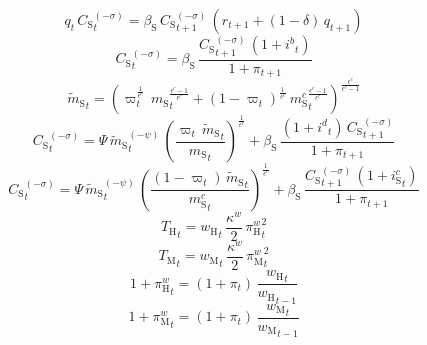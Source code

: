\begin{dmath}
{q}_{t}\, {C_\mathrm{S}}_{t}^{\left(-{\sigma}\right)}={\beta_\mathrm{S}}\, {C_\mathrm{S}}_{t+1}^{\left(-{\sigma}\right)}\, \left({r}_{t+1}+\left(1-{\delta}\right)\, {q}_{t+1}\right)
\end{dmath}
\begin{dmath}
{C_\mathrm{S}}_{t}^{\left(-{\sigma}\right)}={\beta_\mathrm{S}}\, \frac{{C_\mathrm{S}}_{t+1}^{\left(-{\sigma}\right)}\, \left(1+{i^b}_{t}\right)}{1+{\pi}_{t+1}}
\end{dmath}
\begin{dmath}
{\widetilde{m}_\mathrm{S}}_{t}=\left({\varpi}_{t}^{\frac{1}{{\epsilon^c}}}\, {m_\mathrm{S}}_{t}^{\frac{{\epsilon^c}-1}{{\epsilon^c}}}+\left(1-{\varpi}_{t}\right)^{\frac{1}{{\epsilon^c}}}\, {m^c_\mathrm{S}}_{t}^{\frac{{\epsilon^c}-1}{{\epsilon^c}}}\right)^{\frac{{\epsilon^c}}{{\epsilon^c}-1}}
\end{dmath}
\begin{dmath}
{C_\mathrm{S}}_{t}^{\left(-{\sigma}\right)}={\Psi}\, {\widetilde{m}_\mathrm{S}}_{t}^{\left(-{\psi}\right)}\, \left(\frac{{\varpi}_{t}\, {\widetilde{m}_\mathrm{S}}_{t}}{{m_\mathrm{S}}_{t}}\right)^{\frac{1}{{\epsilon^c}}}+{\beta_\mathrm{S}}\, \frac{\left(1+{i^d}_{t}\right)\, {C_\mathrm{S}}_{t+1}^{\left(-{\sigma}\right)}}{1+{\pi}_{t+1}}
\end{dmath}
\begin{dmath}
{C_\mathrm{S}}_{t}^{\left(-{\sigma}\right)}={\Psi}\, {\widetilde{m}_\mathrm{S}}_{t}^{\left(-{\psi}\right)}\, \left(\frac{\left(1-{\varpi}_{t}\right)\, {\widetilde{m}_\mathrm{S}}_{t}}{{m^c_\mathrm{S}}_{t}}\right)^{\frac{1}{{\epsilon^c}}}+{\beta_\mathrm{S}}\, \frac{{C_\mathrm{S}}_{t+1}^{\left(-{\sigma}\right)}\, \left(1+{i^c_\mathrm{S}}_{t}\right)}{1+{\pi}_{t+1}}
\end{dmath}
\begin{dmath}
{T_\mathrm{H}}_{t}={w_\mathrm{H}}_{t}\, \frac{{\kappa^w}}{2}\, {\pi^w_\mathrm{H}}_{t}^{2}
\end{dmath}
\begin{dmath}
{T_\mathrm{M}}_{t}={w_\mathrm{M}}_{t}\, \frac{{\kappa^w}}{2}\, {\pi^w_\mathrm{M}}_{t}^{2}
\end{dmath}
\begin{dmath}
1+{\pi^w_\mathrm{H}}_{t}=\left(1+{\pi}_{t}\right)\, \frac{{w_\mathrm{H}}_{t}}{{w_\mathrm{H}}_{t-1}}
\end{dmath}
\begin{dmath}
1+{\pi^w_\mathrm{M}}_{t}=\left(1+{\pi}_{t}\right)\, \frac{{w_\mathrm{M}}_{t}}{{w_\mathrm{M}}_{t-1}}
\end{dmath}

